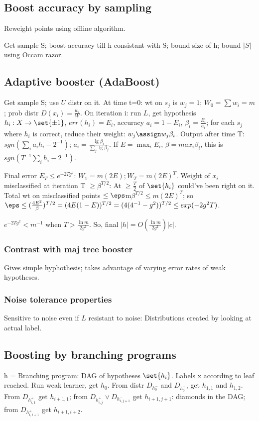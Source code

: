 \documentclass[oneside, article]{memoir}
\begin{document}
\subsection{Boost accuracy by sampling}
Reweight points using offline algorithm.

Get sample S; boost accuracy till h consistant with S; bound size of h; bound $|S|$ using Occam razor.

\subsection{Adaptive booster (AdaBoost)}
Get sample S; use $U$ distr on it. At time t=0: wt on $s_{j}$ is $w_{j}=1$; $W_{0} = \sum w_{i} = m$; prob distr $D(x_i) = \frac{w_{i}}{W}$. On iteration i: run $L$, get hypothesis $h_{i}:X \to \set{\pm 1}$, $err(h_{i}) = E_{i}$, accuracy $a_{i} = 1-E_{i}$, $\beta_{i} = \frac{E_{i}}{a_{i}}$; for each $s_{j}$ where $h_{i}$ is correct, reduce their weight: $w_{j} \assign w_{j}\beta_{i}$. Output after time T: $sgn(\sum_{i}a_{i}h_{i} - 2^{-1})$; $a_{i} = \frac{\lg \beta_{i}}{\sum_{j} \lg \beta_{j}}$. If $E = \max_{i} E_{i}$, $\beta = max_{i} \beta_{i}$, this is $sgn(T^{-1}\sum_{i}h_{i} - 2^{-1})$.

Final error $E_{T} \leq e^{-2Tg^{2}}$: $W_{1} = m(2E); W_{T} = m(2E)^{T}$. Weight of $x_i$ misclassified at iteration T $\geq \beta^{T/2}$: At $\geq \frac{T}{2}$ of $\set{h_{i}}$ could've been right on it. Total wt on misclassified points $\leq \eps $m$ \beta^{T/2} \leq m(2E)^{T}$; so $\eps \leq (\frac{4E^{2}}{\beta})^{T/2} = (4E(1-E))^{T/2} = (4(4^{-1} - g^{2}))^{T/2} \leq exp(-2g^{2}T)$.

$e^{-2Tg^{2}} < m^{-1}$ when $T > \frac{\ln m}{2 g^{2}}$. So, final $|h| = O(\frac{\ln m}{2 g^{2}})|c|$.

\subsubsection{Contrast with maj tree booster}
Gives simple hyphothesis; takes advantage of varying error rates of weak hypotheses. \why

\subsubsection{Noise tolerance properties}
Sensitive to noise even if $L$ resistant to noise: Distributions created by looking at actual label.

\subsection{Boosting by branching programs}
h = Branching program: DAG of hypotheses $\set{h_{i}}$. Labels x according to leaf reached. Run weak learner, get $h_{0}$. From distr $D_{h_{0}^{-}}$ and $D_{h_{0}^{+}}$, get $h_{1,1}$ and $h_{1,2}$. From $D_{h_{i,1}^{+}}$ get $h_{i+1,1}$; from $D_{h_{i,j}^{+}} \lor D_{h_{i,j+1}^{-}}$ get $h_{i+1,j+1}$: diamonds in the DAG; from $D_{h_{i,i+1}^{+}}$ get $h_{i+1,i+2}$.
\end{document}
